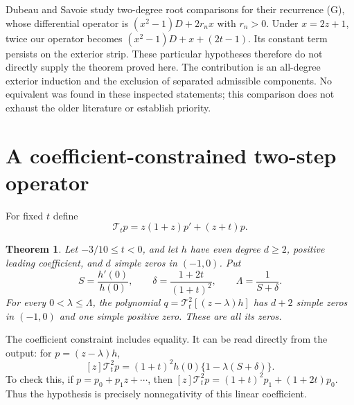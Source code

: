 \documentclass[11pt]{article}
\newtheorem{theorem}{Theorem}[section]
\theoremstyle{remark}
\newcommand{\T}{\mathcal{T}}
\begin{document}
Dubeau and Savoie \cite[Theorems 12--13]{DubeauSavoie1998} study
two-degree root comparisons for their recurrence (G), whose differential
operator is $(x^2-1)D+2r_nx$ with $r_n>0$. Under $x=2z+1$, twice our
operator becomes $(x^2-1)D+x+(2t-1)$. Its constant term persists on the
exterior strip. These particular hypotheses therefore do not directly
supply the theorem proved here. The contribution is an all-degree
exterior induction and the exclusion of separated admissible components.
No equivalent was found in these inspected statements; this comparison
does not exhaust the older literature or establish priority.

\section{A coefficient-constrained two-step operator}

For fixed $t$ define
\begin{equation}\label{eq:T}
 \T_t p=z(1+z)p'+(z+t)p.
\end{equation}

\begin{theorem}\label{thm:operator}
Let $-3/10\le t<0$, and let $h$ have even degree $d\ge2$, positive
leading coefficient, and $d$ simple zeros in $(-1,0)$. Put
\[
 S=\frac{h'(0)}{h(0)},\qquad
 \delta=\frac{1+2t}{(1+t)^2},\qquad
 \Lambda=\frac1{S+\delta}.
\]
For every $0<\lambda\le\Lambda$, the polynomial
$q=\T_t^2[(z-\lambda)h]$ has $d+2$ simple zeros in $(-1,0)$ and one
simple positive zero. These are all its zeros.
\end{theorem}

The coefficient constraint includes equality. It can be read directly
from the output: for $p=(z-\lambda)h$,
\begin{equation}\label{eq:coefficient}
 [z]\T_t^2p=(1+t)^2h(0)\{1-\lambda(S+\delta)\}.
\end{equation}
To check this, if $p=p_0+p_1z+\cdots$, then
$[z]\T_t^2p=(1+t)^2p_1+(1+2t)p_0$.
Thus the hypothesis is precisely nonnegativity of this linear coefficient.
\end{document}

